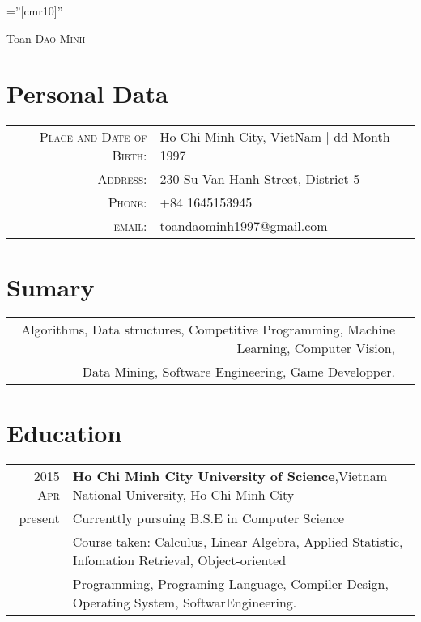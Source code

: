 \documentclass[a4paper,10pt]{article}
\begin{document}

\pagestyle{empty} %

\font\fb=''[cmr10]'' %

\par{\centering
		{\Huge Toan \textsc{Dao Minh}
	}\bigskip\par}

\section{Personal Data}

\begin{tabular}{rl}
    \textsc{Place and Date of Birth:} & Ho Chi Minh City, VietNam  | dd Month 1997 \\
    \textsc{Address:}   & 230 Su Van Hanh Street, District 5 \\
    \textsc{Phone:}     & +84 1645153945\\
    \textsc{email:}     &  \href{mailto:toandaominh1997@gmail.com}{toandaominh1997@gmail.com}
\end{tabular}

\section{Sumary}
\begin{tabular}{rl}
 \textsc Algorithms, Data structures, Competitive Programming, Machine Learning, Computer Vision,\\ Data Mining, Software Engineering, Game Developper.
\end{tabular}

\section{Education}
\begin{tabular}{rl}	
 \textsc{2015 Apr} & \textbf{Ho Chi Minh City University of Science},Vietnam National University, Ho Chi Minh City\\
present & Currenttly pursuing B.S.E in Computer Science\\
& Course taken: Calculus, Linear Algebra, Applied Statistic, Infomation Retrieval, Object-oriented\\
& Programming, Programing Language, Compiler Design, Operating System, SoftwarEngineering.\\
\end{tabular}
\end{document}
